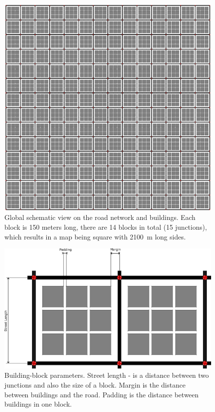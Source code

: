 \documentclass[]{nsm-thesis}
\begin{document}
\begin{figure}
	\centering
	\includegraphics[width=1\textwidth]{figures/ManhattanGrid.png}
	\caption{Global schematic view on the road network and buildings. Each block is 150 meters long, there are 14 blocks in total (15 junctions), which results in a map being square with \SI{2100}{\meter} long sides.}
	\label{fig:manhattangrid}
\end{figure}

\begin{figure}
	\centering
	\includegraphics[width=1\textwidth]{figures/ManhattanGridBlock-commented.png}
	\caption{Building-block parameters. Street length - is a distance between two junctions and also the size of a block. Margin is the distance between buildings and the road. Padding is the distance between buildings in one block.}
	\label{fig:manhattangridblock}
\end{figure}
\end{document}
